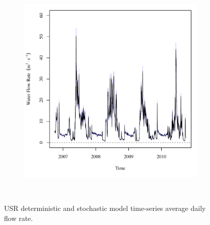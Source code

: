 \begin{landscape}
\begin{figure}
\begin{subfigure}{0.7\textwidth}
			\includegraphics[width=\tableCustomSize]{"Figures/Results_USR/Stochastic/Q U201"}
		\end{subfigure}\\
		\caption{USR deterministic and stochastic model time-series average daily flow rate.}
	\end{figure}
\end{landscape}
\subfiguremid
